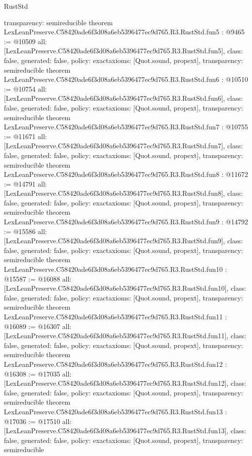 \begin{lexlean}{RustStd}
\begin{coremodule}
{  transparency: semireducible
}
theorem LexLeanPreserve.C58420ade6f3d08a6eb5396477ec9d765.R3.RustStd.fun5 : @9465 := @10509 {
  all: [LexLeanPreserve.C58420ade6f3d08a6eb5396477ec9d765.R3.RustStd.fun5],
  class: false,
  generated: false,
  policy: exact{axioms: [Quot.sound, propext]},
  transparency: semireducible
}
theorem LexLeanPreserve.C58420ade6f3d08a6eb5396477ec9d765.R3.RustStd.fun6 : @10510 := @10754 {
  all: [LexLeanPreserve.C58420ade6f3d08a6eb5396477ec9d765.R3.RustStd.fun6],
  class: false,
  generated: false,
  policy: exact{axioms: [Quot.sound, propext]},
  transparency: semireducible
}
theorem LexLeanPreserve.C58420ade6f3d08a6eb5396477ec9d765.R3.RustStd.fun7 : @10755 := @11671 {
  all: [LexLeanPreserve.C58420ade6f3d08a6eb5396477ec9d765.R3.RustStd.fun7],
  class: false,
  generated: false,
  policy: exact{axioms: [Quot.sound, propext]},
  transparency: semireducible
}
theorem LexLeanPreserve.C58420ade6f3d08a6eb5396477ec9d765.R3.RustStd.fun8 : @11672 := @14791 {
  all: [LexLeanPreserve.C58420ade6f3d08a6eb5396477ec9d765.R3.RustStd.fun8],
  class: false,
  generated: false,
  policy: exact{axioms: [Quot.sound, propext]},
  transparency: semireducible
}
theorem LexLeanPreserve.C58420ade6f3d08a6eb5396477ec9d765.R3.RustStd.fun9 : @14792 := @15586 {
  all: [LexLeanPreserve.C58420ade6f3d08a6eb5396477ec9d765.R3.RustStd.fun9],
  class: false,
  generated: false,
  policy: exact{axioms: [Quot.sound, propext]},
  transparency: semireducible
}
theorem LexLeanPreserve.C58420ade6f3d08a6eb5396477ec9d765.R3.RustStd.fun10 : @15587 := @16088 {
  all: [LexLeanPreserve.C58420ade6f3d08a6eb5396477ec9d765.R3.RustStd.fun10],
  class: false,
  generated: false,
  policy: exact{axioms: [Quot.sound, propext]},
  transparency: semireducible
}
theorem LexLeanPreserve.C58420ade6f3d08a6eb5396477ec9d765.R3.RustStd.fun11 : @16089 := @16307 {
  all: [LexLeanPreserve.C58420ade6f3d08a6eb5396477ec9d765.R3.RustStd.fun11],
  class: false,
  generated: false,
  policy: exact{axioms: [Quot.sound, propext]},
  transparency: semireducible
}
theorem LexLeanPreserve.C58420ade6f3d08a6eb5396477ec9d765.R3.RustStd.fun12 : @16308 := @17035 {
  all: [LexLeanPreserve.C58420ade6f3d08a6eb5396477ec9d765.R3.RustStd.fun12],
  class: false,
  generated: false,
  policy: exact{axioms: [Quot.sound, propext]},
  transparency: semireducible
}
theorem LexLeanPreserve.C58420ade6f3d08a6eb5396477ec9d765.R3.RustStd.fun13 : @17036 := @17510 {
  all: [LexLeanPreserve.C58420ade6f3d08a6eb5396477ec9d765.R3.RustStd.fun13],
  class: false,
  generated: false,
  policy: exact{axioms: [Quot.sound, propext]},
  transparency: semireducible
}
\end{coremodule}
\end{lexlean}
